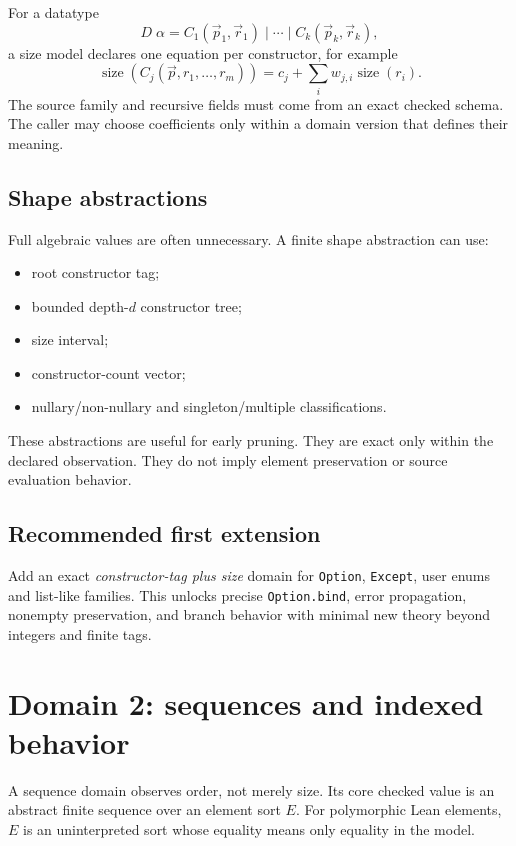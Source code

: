 \documentclass[11pt,oneside]{report}
\newcommand{\code}[1]{\texttt{#1}}
\begin{document}
For a datatype
\[
D\;\alpha = C_1(\vec{p}_1,\vec{r}_1)\mid\cdots\mid C_k(\vec{p}_k,\vec{r}_k),
\]
a size model declares one equation per constructor, for example
\[
\operatorname{size}(C_j(\vec{p},r_1,\ldots,r_m))
 = c_j + \sum_i w_{j,i}\operatorname{size}(r_i).
\]
The source family and recursive fields must come from an exact checked schema. The caller may choose coefficients only within a domain version that defines their meaning.

\subsection{Shape abstractions}

Full algebraic values are often unnecessary. A finite shape abstraction can use:

\begin{itemize}[leftmargin=2em]
\item root constructor tag;
\item bounded depth-$d$ constructor tree;
\item size interval;
\item constructor-count vector;
\item nullary/non-nullary and singleton/multiple classifications.
\end{itemize}

These abstractions are useful for early pruning. They are exact only within the declared observation. They do not imply element preservation or source evaluation behavior.

\subsection{Recommended first extension}

Add an exact \emph{constructor-tag plus size} domain for \code{Option}, \code{Except}, user enums and list-like families. This unlocks precise \code{Option.bind}, error propagation, nonempty preservation, and branch behavior with minimal new theory beyond integers and finite tags.

\section{Domain 2: sequences and indexed behavior}
\label{sec:domain-sequence}

A sequence domain observes order, not merely size. Its core checked value is an abstract finite sequence over an element sort $E$. For polymorphic Lean elements, $E$ is an uninterpreted sort whose equality means only equality in the model.
\end{document}
